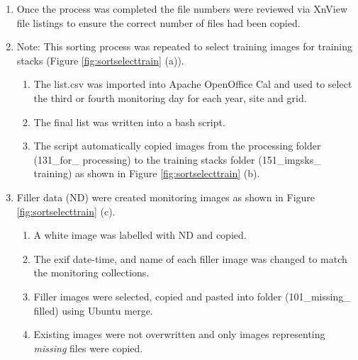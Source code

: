 \begin{enumerate}
\begin{enumerate}
\begin{lstlisting}[language=bash, caption=Bash snippet to sort collections., label=cd:sort]
#Use exiftool -tagsFromFile to get tages from files...cp copy from DIR - to DIR#
ref_id	//copy exif tags//copy_from Dir //save_to Dir
exiftool -tagsFromFile cp /ALHimgdata/071_sort_collections/imgdata/10/1_T110ANCM/C1/1/1_101124_124112.jpg
/ALHimgdata/081_sorted_collections/imgdata/10/1_T110ANCM/C1/1C1/1C1_101124_124112_1.jpg
exiftool -tagsFromFile cp /ALHimgdata/071_sort_collections/imgdata/10/1_T110ANCM/C1/1/1_101124_124113.jpg /ALHimgdata/081_sorted_collections/imgdata/10/1_T110ANCM/C2/1C2/1C2_101124_124113_2.jpg
\end{lstlisting}
\end{enumerate}
\item Once the process was completed the file numbers were reviewed via XnView file listings to ensure the correct number of files had been copied.
\item Note: This sorting process was repeated to select training images for training stacks (Figure \ref{fig:sortselecttrain} (a)). 
	\begin{enumerate}
	\item The list.csv was imported into Apache OpenOffice Cal and used to select the third or fourth monitoring day for each year, site and grid.
	\item The final list was written into a bash script.
	\item The script automatically copied images from the processing folder (131\_for\_ processing) to the training stacks folder  (151\_imgsks\_ training) as shown in Figure \ref{fig:sortselecttrain} (b).
\end{enumerate}
\item Filler data (ND) were created monitoring images as shown in Figure \ref{fig:sortselecttrain} (c).
	\begin{enumerate}
	\item A white image was labelled with ND and copied.
	\item The exif date-time, and name of each filler image was changed to match the monitoring collections.
	\item Filler images were selected, copied and pasted into folder (101\_missing\_ filled) using Ubuntu merge.
	\item  Existing images were not overwritten and only images representing \emph{missing} files were copied.
	\end{enumerate}
\end{enumerate}

